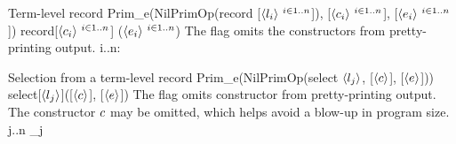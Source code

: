 \documentclass[12pt,twoside,fleqn]{article}
\begin{document}
  {Term-level record}
  {}
  {Prim\_e(NilPrimOp(record [$\langle{l_i}\rangle\ {}^{i\in 1..n}$]),%
            [$\langle{c_i}\rangle\ {}^{i\in 1..n}$],%
            [$\langle{e_i}\rangle\ {}^{i\in 1..n}$])}
  {record[$\langle{c_i}\rangle\ {}^{i\in 1..n}$]%
         ($\langle{e_i}\rangle\ {}^{i\in 1..n}$)}
  {The  flag omits the constructors from
   pretty-printing output.}
 {\irule
  {\forall i..n:\quad
     }
  {\validconstructor{\context}
       {}
       {}}}

  {Selection from a term-level record}
  {\eselect{\expression}{\fieldlabel}}
  {Prim\_e(NilPrimOp(select $\langle{l_j}\rangle$,%
                      [$\langle{c}\rangle$],%
                      [$\langle{e}\rangle$]))}
  {select[$\langle{l_j}\rangle$]([$\langle{c}\rangle$],%
                      [$\langle{e}\rangle$])}
  {The  flag omits constructor from
   pretty-printing output.  The constructor $c$ may be omitted,
   which helps avoid a blow-up in program size.}
 {\irule
  {\equivconstructor{\context}{\constructor}
       {}{\ktype}\qquad
     j..n\qquad
   \validexpression{\context}{\expression}{\constructor}}
  {\validconstructor{\context}
       {}
       {\constructor_j}}}
\end{document}
